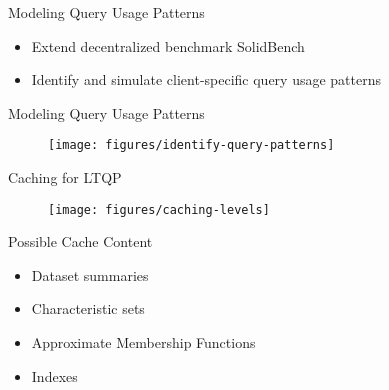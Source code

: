 \begin{frame}{Modeling Query Usage Patterns}
    \begin{itemize}
        \item Extend decentralized benchmark SolidBench 
        \item Identify and simulate client-specific query usage patterns
    \end{itemize}
\end{frame}

\begin{frame}{Modeling Query Usage Patterns}
    \begin{figure}
        \centering
        \texttt{[image: figures/identify-query-patterns]}
    \end{figure}
\end{frame}



\begin{frame}{Caching for LTQP}
    \begin{figure}
        \centering
        \texttt{[image: figures/caching-levels]}
    \end{figure}
\end{frame}

\begin{frame}{Possible Cache Content}
    \begin{itemize}
        \item Dataset summaries
        \item Characteristic sets 
        \item Approximate Membership Functions 
        \item Indexes
    \end{itemize}
\end{frame}
    
